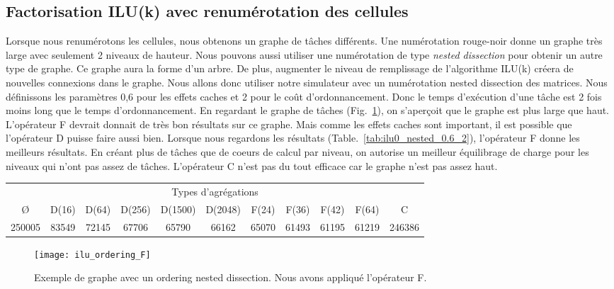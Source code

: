 \subsection{Factorisation ILU(k) avec renumérotation des cellules}
Lorsque nous renumérotons les cellules, nous obtenons un graphe de tâches différents.
%
Une numérotation rouge-noir donne un graphe très large avec seulement 2 niveaux de hauteur.
%
Nous pouvons aussi utiliser une numérotation de type {\em nested dissection} pour obtenir un autre type de graphe.
%
Ce graphe aura la forme d'un arbre.
%
De plus, augmenter le niveau de remplissage de l'algorithme ILU(k) créera de nouvelles connexions dans le graphe.
%
Nous allons donc utiliser notre simulateur avec un numérotation nested dissection des matrices.
%
Nous définissons les paramètres 0,6 pour les effets caches et 2 pour le coût d'ordonnancement.
%
Donc le temps d'exécution d'une tâche est 2 fois moins long que le temps d'ordonnancement.
%
En regardant le graphe de tâches (Fig.~\ref{fig:ilu_ordering_F}), on s'aperçoit que le graphe est plus large que haut.
%
L'opérateur F devrait donnait de très bon résultats sur ce graphe.
%
Mais comme les effets caches sont important, il est possible que l'opérateur D puisse faire aussi bien.
%
Lorsque nous regardons les résultats (Table.~\ref{tab:ilu0_nested_0.6_2}), l'opérateur F donne les meilleurs résultats.
%
En créant plus de tâches que de coeurs de calcul par niveau, on autorise un meilleur équilibrage de charge pour les niveaux qui n'ont pas assez de tâches.
%
L'opérateur C n'est pas du tout efficace car le graphe n'est pas assez haut.


\begin{center}
  \begin{tabular}{|c|c|c|c|c|c|c|c|c|c|c|}
    \hline
    \multicolumn{11}{|c|}{Types d'agrégations}\\
    \O & D(16) & D(64) & D(256) & D(1500) & D(2048) & F(24) & F(36) & F(42) & F(64) & C \\
    \hline
    250005 & 83549 & 72145 & 67706 & 65790 & 66162 & 65070 & 61493 & 61195 & 61219 & 246386 \\
    \hline
  \end{tabular}
  \label{tab:ilu0_nested_0.6_2}
\end{center}


\begin{figure}[t!]
  \centering
  \texttt{[image: ilu\_ordering\_F]}
  \caption{Exemple de graphe avec un ordering nested dissection. Nous avons appliqué l'opérateur F.}
  \label{fig:ilu_ordering_F}
\end{figure}


